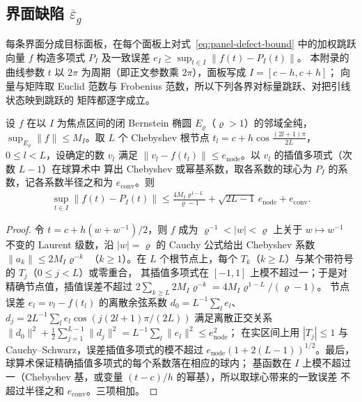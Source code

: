 \subsection{界面缺陷 $\overline\varepsilon_g$}
\label{app:reliable-eps}

每条界面分成目标面板，在每个面板上对式~\eqref{eq:panel-defect-bound} 中的加权跳跃向量
$f$ 构造多项式 $P_I$ 及一致误差 $e_I\geq\sup_{t\in I}\lVert f(t)-P_I(t)\rVert$。
本附录的曲线参数 $t$ 以 $2\pi$ 为周期（即正文参数乘 $2\pi$），面板写成 $I=[c-h,c+h]$；
向量与矩阵取 Euclid 范数与 Frobenius 范数，所以下列各界对标量跳跃、对把引线状态映到跳跃的
矩阵都逐字成立。

\begin{lemma}
  \label{lem:chebyshev-interp}
  设 $f$ 在以 $I$ 为焦点区间的闭 Bernstein 椭圆 $E_\varrho$（$\varrho>1$）的邻域全纯，
  $\sup_{E_\varrho}\lVert f\rVert\leq M_I$。取 $L$ 个 Chebyshev 根节点
  $t_l=c+h\cos\frac{(2l+1)\pi}{2L}$，$0\le l<L$，设确定的数 $v_l$ 满足
  $\lVert v_l-f(t_l)\rVert\leq e_{\mathrm{node}}$。以 $v_l$ 的插值多项式（次数 $L-1$）在球算术中
  算出 Chebyshev 或幂基系数，取各系数的球心为 $P_I$ 的系数，记各系数半径之和为
  $e_{\mathrm{conv}}$。则
  \begin{align}
    \sup_{t\in I}\lVert f(t)-P_I(t)\rVert\leq\frac{4M_I\varrho^{1-L}}{\varrho-1}
    +\sqrt{2L-1}\,e_{\mathrm{node}}+e_{\mathrm{conv}}.
    \label{eq:chebyshev-panel-error}
  \end{align}
\end{lemma}

\begin{proof}
  令 $t=c+h(w+w^{-1})/2$，则 $f$ 成为 $\varrho^{-1}<|w|<\varrho$ 上关于 $w\mapsto w^{-1}$ 不变的
  Laurent 级数，沿 $|w|=\varrho$ 的 Cauchy 公式给出 Chebyshev 系数 $\lVert a_k\rVert\leq2M_I\varrho^{-k}$
  （$k\ge1$）。在 $L$ 个根节点上，每个 $T_k$（$k\ge L$）与某个带符号的 $T_j$（$0\le j<L$）或零重合，
  其插值多项式在 $[-1,1]$ 上模不超过一；于是对精确节点值，插值误差不超过
  $2\sum_{k\ge L}2M_I\varrho^{-k}=4M_I\varrho^{1-L}/(\varrho-1)$。
  节点误差 $e_l=v_l-f(t_l)$ 的离散余弦系数 $d_0=L^{-1}\sum_le_l$、
  $d_j=2L^{-1}\sum_le_l\cos(j(2l+1)\pi/(2L))$ 满足离散正交关系
  $\lVert d_0\rVert^2+\frac12\sum_{j=1}^{L-1}\lVert d_j\rVert^2=L^{-1}\sum_l\lVert e_l\rVert^2\leq e_{\mathrm{node}}^2$；
  在实区间上用 $|T_j|\leq1$ 与 Cauchy--Schwarz，误差插值多项式的模不超过
  $e_{\mathrm{node}}(1+2(L-1))^{1/2}$。最后，球算术保证精确插值多项式的每个系数落在相应的球内；
  基函数在 $I$ 上模不超过一（Chebyshev 基，或变量 $(t-c)/h$ 的幂基），所以取球心带来的一致误差
  不超过半径之和 $e_{\mathrm{conv}}$。三项相加。
\end{proof}

